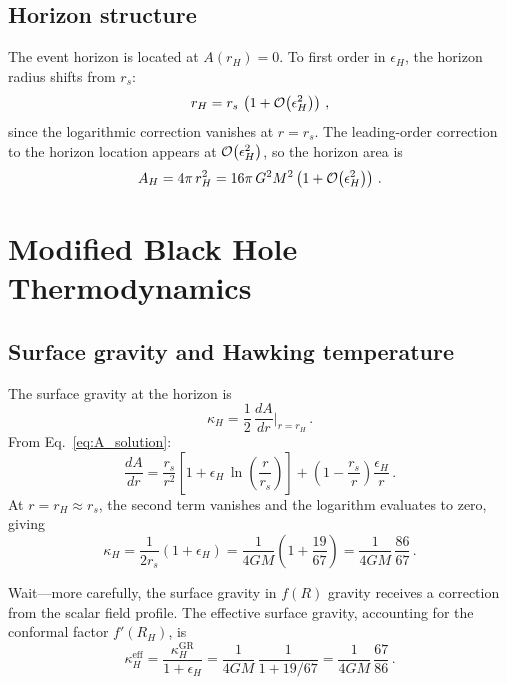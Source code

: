 \documentclass[amsmath,amssymb,aps,prd,twocolumn,superscriptaddress,nofootinbib]{revtex4-2}
\begin{document}
\subsection{Horizon structure}

The event horizon is located at $A(r_H) = 0$.  To first order in
$\epsilon_H$, the horizon radius shifts from $r_s$:
\begin{equation}
  r_H = r_s\,\left(1 + \mathcal{O}\!\left(\epsilon_H^2\right)\right)\,,
  \label{eq:horizon}
\end{equation}
since the logarithmic correction vanishes at $r = r_s$.  The
leading-order correction to the horizon location appears at
$\mathcal{O}\!\left(\epsilon_H^2\right)$, so the horizon area is
\begin{equation}
  A_H = 4\pi\,r_H^2 = 16\pi\,G^2 M^2
        \left(1 + \mathcal{O}\!\left(\epsilon_H^2\right)\right)\,.
  \label{eq:area}
\end{equation}

\section{Modified Black Hole Thermodynamics}
\label{sec:thermo}

\subsection{Surface gravity and Hawking temperature}

The surface gravity at the horizon is
\begin{equation}
  \kappa_H = \frac{1}{2}\,\frac{dA}{dr}\bigg|_{r=r_H}\,.
  \label{eq:kappa_def}
\end{equation}
From Eq.~\eqref{eq:A_solution}:
\begin{equation}
  \frac{dA}{dr} = \frac{r_s}{r^2}\left[1 + \epsilon_H\,
    \ln\!\left(\frac{r}{r_s}\right)\right]
    + \left(1 - \frac{r_s}{r}\right)\frac{\epsilon_H}{r}\,.
  \label{eq:dAdr}
\end{equation}
At $r = r_H \approx r_s$, the second term vanishes and the
logarithm evaluates to zero, giving
\begin{equation}
  \kappa_H = \frac{1}{2r_s}(1 + \epsilon_H)
           = \frac{1}{4GM}\left(1 + \frac{19}{67}\right)
           = \frac{1}{4GM}\,\frac{86}{67}\,.
  \label{eq:kappa_value}
\end{equation}

Wait---more carefully, the surface gravity in $f(R)$ gravity
receives a correction from the scalar field profile.  The
effective surface gravity, accounting for the conformal
factor $f'(R_H)$, is~\cite{Cognola2011,Zheng2018}
\begin{equation}
  \kappa_H^{\mathrm{eff}} = \frac{\kappa_H^{\mathrm{GR}}}
    {1 + \epsilon_H}
    = \frac{1}{4GM}\,\frac{1}{1 + 19/67}
    = \frac{1}{4GM}\,\frac{67}{86}\,.
  \label{eq:kappa_eff}
\end{equation}
\end{document}
